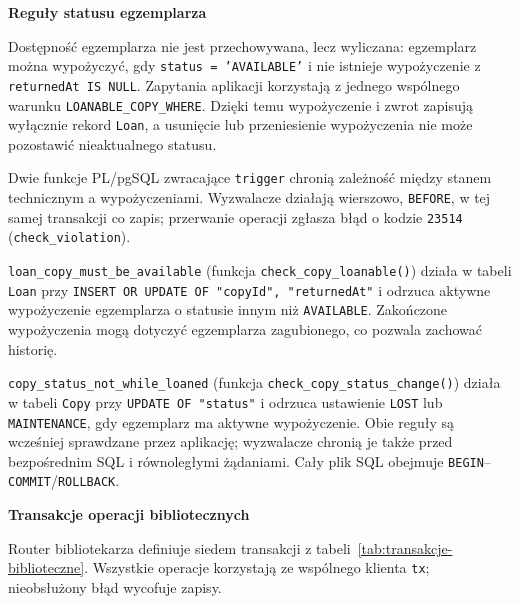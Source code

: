 \documentclass[11pt, a4paper]{article}
\begin{document}
\noindent\textbf{Reguły statusu egzemplarza}

Dostępność egzemplarza nie jest przechowywana, lecz wyliczana: egzemplarz można wypożyczyć, gdy \texttt{status = 'AVAILABLE'} i nie istnieje wypożyczenie z \texttt{returnedAt IS NULL}. Zapytania aplikacji korzystają z jednego wspólnego warunku \texttt{LOANABLE\_\allowbreak COPY\_\allowbreak WHERE}. Dzięki temu wypożyczenie i zwrot zapisują wyłącznie rekord \texttt{Loan}, a usunięcie lub przeniesienie wypożyczenia nie może pozostawić nieaktualnego statusu.

Dwie funkcje PL/pgSQL zwracające \texttt{trigger} chronią zależność między stanem technicznym a wypożyczeniami. Wyzwalacze działają wierszowo, \texttt{BEFORE}, w tej samej transakcji co zapis; przerwanie operacji zgłasza błąd o kodzie \texttt{23514} (\texttt{check\_violation}).~\cite{postgres-trigger}

\texttt{loan\_\allowbreak copy\_\allowbreak must\_\allowbreak be\_\allowbreak available} (funkcja \texttt{check\_\allowbreak copy\_\allowbreak loanable()}) działa w tabeli \texttt{Loan} przy \texttt{INSERT OR UPDATE OF "copyId", "returnedAt"} i odrzuca aktywne wypożyczenie egzemplarza o statusie innym niż \texttt{AVAILABLE}. Zakończone wypożyczenia mogą dotyczyć egzemplarza zagubionego, co pozwala zachować historię.

\texttt{copy\_\allowbreak status\_\allowbreak not\_\allowbreak while\_\allowbreak loaned} (funkcja \texttt{check\_\allowbreak copy\_\allowbreak status\_\allowbreak change()}) działa w tabeli \texttt{Copy} przy \texttt{UPDATE OF "status"} i odrzuca ustawienie \texttt{LOST} lub \texttt{MAINTENANCE}, gdy egzemplarz ma aktywne wypożyczenie. Obie reguły są wcześniej sprawdzane przez aplikację; wyzwalacze chronią je także przed bezpośrednim SQL i równoległymi żądaniami. Cały plik SQL obejmuje \texttt{BEGIN}--\texttt{COMMIT}/\texttt{ROLLBACK}.

\noindent\textbf{Transakcje operacji bibliotecznych}

Router bibliotekarza definiuje siedem transakcji z tabeli~\ref{tab:transakcje-biblioteczne}. Wszystkie operacje korzystają ze wspólnego klienta \texttt{tx}; nieobsłużony błąd wycofuje zapisy.~\cite{prisma-transactions}
\end{document}
